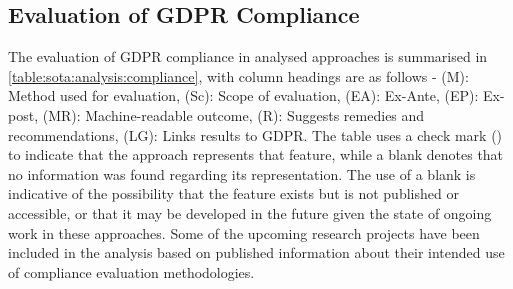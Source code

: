 \subsection{Evaluation of GDPR Compliance}\label{sota:analysis:compliance}
The evaluation of GDPR compliance in analysed approaches is summarised in \autoref{table:sota:analysis:compliance}, with column headings are as follows - (M): Method used for evaluation, (Sc): Scope of evaluation, (EA): Ex-Ante, (EP): Ex-post, (MR): Machine-readable outcome, (R): Suggests remedies and recommendations, (LG): Links results to GDPR.
The table uses a check mark (\cmark) to indicate that the approach represents that feature, while a blank denotes that no information was found regarding its representation. The use of a blank is indicative of the possibility that the feature exists but is not published or accessible, or that it may be developed in the future given the state of ongoing work in these approaches.
Some of the upcoming research projects have been included in the analysis based on published information about their intended use of compliance evaluation methodologies.
